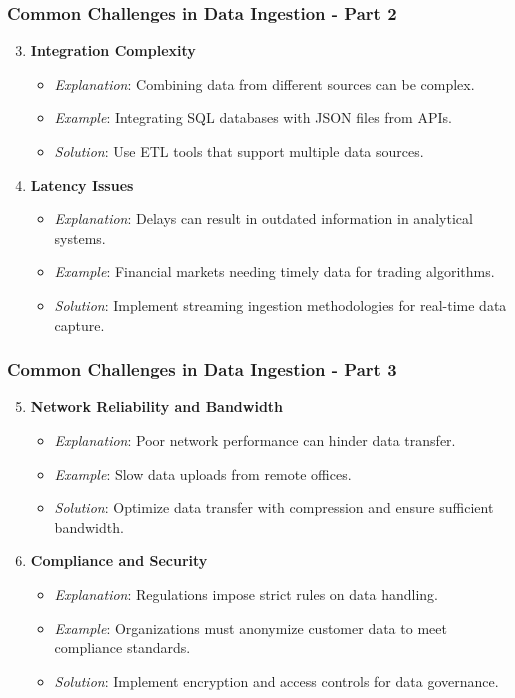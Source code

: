\documentclass[aspectratio=169]{beamer}
\begin{document}
\begin{frame}[fragile]
    \frametitle{Common Challenges in Data Ingestion - Part 2}
    \begin{enumerate}
        \setcounter{enumi}{2}
        \item \textbf{Integration Complexity}
            \begin{itemize}
                \item \textit{Explanation}: Combining data from different sources can be complex.
                \item \textit{Example}: Integrating SQL databases with JSON files from APIs.
                \item \textit{Solution}: Use ETL tools that support multiple data sources.
            \end{itemize}
        \item \textbf{Latency Issues}
            \begin{itemize}
                \item \textit{Explanation}: Delays can result in outdated information in analytical systems.
                \item \textit{Example}: Financial markets needing timely data for trading algorithms.
                \item \textit{Solution}: Implement streaming ingestion methodologies for real-time data capture.
            \end{itemize}
    \end{enumerate}
\end{frame}

\begin{frame}[fragile]
    \frametitle{Common Challenges in Data Ingestion - Part 3}
    \begin{enumerate}
        \setcounter{enumi}{4}
        \item \textbf{Network Reliability and Bandwidth}
            \begin{itemize}
                \item \textit{Explanation}: Poor network performance can hinder data transfer.
                \item \textit{Example}: Slow data uploads from remote offices.
                \item \textit{Solution}: Optimize data transfer with compression and ensure sufficient bandwidth.
            \end{itemize}
        \item \textbf{Compliance and Security}
            \begin{itemize}
                \item \textit{Explanation}: Regulations impose strict rules on data handling.
                \item \textit{Example}: Organizations must anonymize customer data to meet compliance standards.
                \item \textit{Solution}: Implement encryption and access controls for data governance.
            \end{itemize}
    \end{enumerate}
\end{frame}
\end{document}
